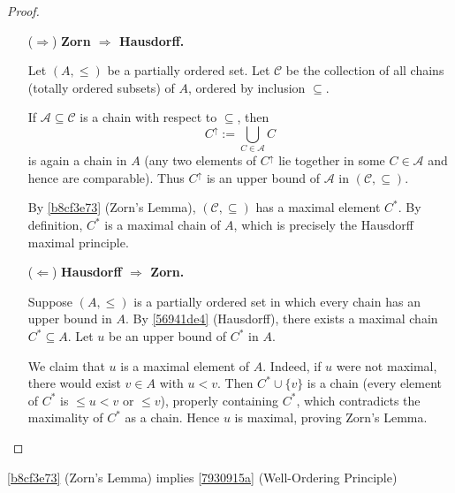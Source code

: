 \begin{proof}
    \begin{enumerate}
        \item[($\Rightarrow$)] \textbf{Zorn $\Rightarrow$ Hausdorff.}
        
        Let $(A,\le)$ be a partially ordered set. Let $\mathcal{C}$ be the collection of all chains (totally ordered subsets) of $A$, ordered by inclusion $\subseteq$. 
        
        If $\mathcal{A}\subseteq \mathcal{C}$ is a chain with respect to $\subseteq$, then
        \[
            C^\uparrow := \bigcup_{C\in \mathcal{A}} C
        \]
        is again a chain in $A$ (any two elements of $C^\uparrow$ lie together in some $C\in\mathcal{A}$ and hence are comparable). Thus $C^\uparrow$ is an upper bound of $\mathcal{A}$ in $(\mathcal{C},\subseteq)$.
        
        By \cref{b8cf3e73} (Zorn's Lemma), $(\mathcal{C},\subseteq)$ has a maximal element $C^*$. By definition, $C^*$ is a maximal chain of $A$, which is precisely the Hausdorff maximal principle.
        
        \item[($\Leftarrow$)] \textbf{Hausdorff $\Rightarrow$ Zorn.}
        
        Suppose $(A,\le)$ is a partially ordered set in which every chain has an upper bound in $A$. By \cref{56941de4} (Hausdorff), there exists a maximal chain $C^*\subseteq A$. Let $u$ be an upper bound of $C^*$ in $A$.
        
        We claim that $u$ is a maximal element of $A$. Indeed, if $u$ were not maximal, there would exist $v\in A$ with $u<v$. Then $C^*\cup\{v\}$ is a chain (every element of $C^*$ is $\le u<v$ or $\le v$), properly containing $C^*$, which contradicts the maximality of $C^*$ as a chain. Hence $u$ is maximal, proving Zorn's Lemma.
    \end{enumerate}
\end{proof}

\begin{thm}
    \cref{b8cf3e73} (Zorn's Lemma) implies \cref{7930915a} (Well-Ordering Principle)
\end{thm}

